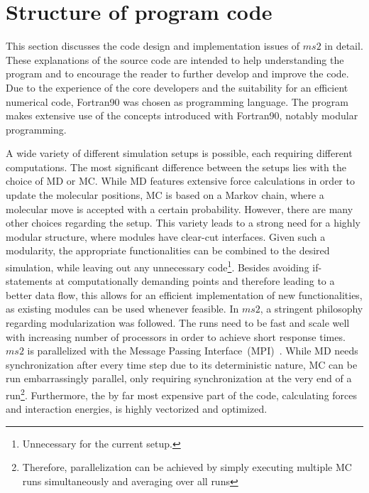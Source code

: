 % 



\section{Structure of program code}
\label{sec:Structure of program code}

This section discusses the code design and implementation issues of $ms2$ in detail. These explanations of the source code are intended to help understanding the program and to encourage the reader to further develop and improve the code. Due to the experience of the core developers and the suitability for an efficient numerical code, Fortran90 was chosen as programming language. The program makes extensive use of the concepts introduced with Fortran90, notably modular programming.
% 

A wide variety of different simulation setups is possible, each requiring different computations. The most significant difference between the setups lies with the choice of MD or MC. While MD features extensive force calculations in order to update the molecular positions, MC is based on a Markov chain, where a molecular move is accepted with a certain probability. However, there are many other choices regarding the setup. This variety leads to a strong need for a highly modular structure, where modules have clear-cut interfaces. Given such a modularity, the appropriate functionalities can be combined to the desired simulation, while leaving out any unnecessary code\footnote{Unnecessary for the current setup.}. Besides avoiding if-statements at computationally demanding points and therefore leading to a better data flow, this allows for an efficient implementation of new functionalities, as existing modules can be used whenever feasible. In $ms2$, a stringent philosophy regarding modularization was followed.
% 
The runs need to be fast and scale well with increasing number of processors in order to achieve short response times. $ms2$ is parallelized with the Message Passing Interface~(MPI)~\parencite{Forum2009}. While MD needs synchronization after every time step due to its deterministic nature, MC can be run embarrassingly parallel, only requiring synchronization at the very end of a run\footnote{Therefore, parallelization can be achieved by simply executing multiple MC runs simultaneously and averaging over all runs}. Furthermore, the by far most expensive part of the code, calculating forces and interaction energies, is highly vectorized and optimized.

